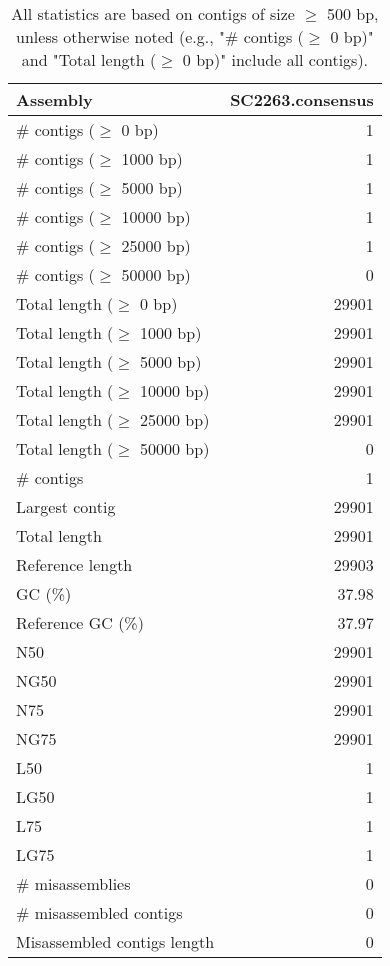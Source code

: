 \documentclass[12pt,a4paper]{article}
\begin{document}
\begin{table}[ht]
\begin{center}
\caption{All statistics are based on contigs of size $\geq$ 500 bp, unless otherwise noted (e.g., "\# contigs ($\geq$ 0 bp)" and "Total length ($\geq$ 0 bp)" include all contigs).}
\begin{tabular}{|l*{1}{|r}|}
\hline
Assembly & SC2263.consensus \\ \hline
\# contigs ($\geq$ 0 bp) & 1 \\ \hline
\# contigs ($\geq$ 1000 bp) & 1 \\ \hline
\# contigs ($\geq$ 5000 bp) & 1 \\ \hline
\# contigs ($\geq$ 10000 bp) & 1 \\ \hline
\# contigs ($\geq$ 25000 bp) & 1 \\ \hline
\# contigs ($\geq$ 50000 bp) & 0 \\ \hline
Total length ($\geq$ 0 bp) & 29901 \\ \hline
Total length ($\geq$ 1000 bp) & 29901 \\ \hline
Total length ($\geq$ 5000 bp) & 29901 \\ \hline
Total length ($\geq$ 10000 bp) & 29901 \\ \hline
Total length ($\geq$ 25000 bp) & 29901 \\ \hline
Total length ($\geq$ 50000 bp) & 0 \\ \hline
\# contigs & 1 \\ \hline
Largest contig & 29901 \\ \hline
Total length & 29901 \\ \hline
Reference length & 29903 \\ \hline
GC (\%) & 37.98 \\ \hline
Reference GC (\%) & 37.97 \\ \hline
N50 & 29901 \\ \hline
NG50 & 29901 \\ \hline
N75 & 29901 \\ \hline
NG75 & 29901 \\ \hline
L50 & 1 \\ \hline
LG50 & 1 \\ \hline
L75 & 1 \\ \hline
LG75 & 1 \\ \hline
\# misassemblies & 0 \\ \hline
\# misassembled contigs & 0 \\ \hline
Misassembled contigs length & 0 \\ \hline

\end{tabular}
\end{center}
\end{table}
\end{document}
